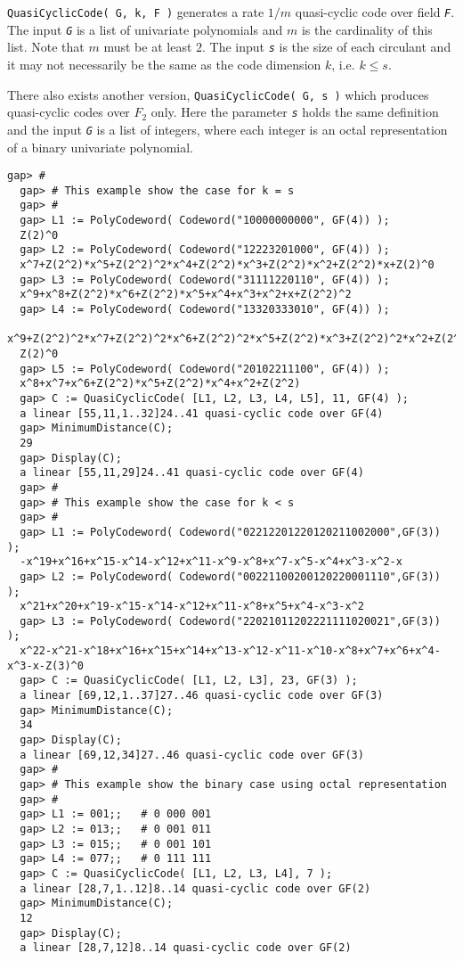 \documentclass[a4paper,11pt]{report}
\begin{document}
{{{ \texttt{QuasiCyclicCode( G, k, F )} generates a rate $1/m$ quasi-cyclic code over field \mbox{\texttt{\slshape F}}. The input \mbox{\texttt{\slshape G}} is a list of univariate polynomials and $m$ is the cardinality of this list. Note that $m$ must be at least $2$. The input \mbox{\texttt{\slshape s}} is the size of each circulant and it may not necessarily be the same as the
code dimension $k$, i.e. $k \le s$. 

 There also exists another version, \texttt{QuasiCyclicCode( G, s )} which produces quasi-cyclic codes over $F_2$ only. Here the parameter \mbox{\texttt{\slshape s}} holds the same definition and the input \mbox{\texttt{\slshape G}} is a list of integers, where each integer is an octal representation of a
binary univariate polynomial. }

 
\begin{Verbatim}[fontsize=\small,frame=single,label=Example]
  gap> #
  gap> # This example show the case for k = s
  gap> #
  gap> L1 := PolyCodeword( Codeword("10000000000", GF(4)) );
  Z(2)^0
  gap> L2 := PolyCodeword( Codeword("12223201000", GF(4)) );
  x^7+Z(2^2)*x^5+Z(2^2)^2*x^4+Z(2^2)*x^3+Z(2^2)*x^2+Z(2^2)*x+Z(2)^0
  gap> L3 := PolyCodeword( Codeword("31111220110", GF(4)) );
  x^9+x^8+Z(2^2)*x^6+Z(2^2)*x^5+x^4+x^3+x^2+x+Z(2^2)^2
  gap> L4 := PolyCodeword( Codeword("13320333010", GF(4)) );
  x^9+Z(2^2)^2*x^7+Z(2^2)^2*x^6+Z(2^2)^2*x^5+Z(2^2)*x^3+Z(2^2)^2*x^2+Z(2^2)^2*x+\
  Z(2)^0
  gap> L5 := PolyCodeword( Codeword("20102211100", GF(4)) );
  x^8+x^7+x^6+Z(2^2)*x^5+Z(2^2)*x^4+x^2+Z(2^2)
  gap> C := QuasiCyclicCode( [L1, L2, L3, L4, L5], 11, GF(4) );
  a linear [55,11,1..32]24..41 quasi-cyclic code over GF(4)
  gap> MinimumDistance(C);
  29
  gap> Display(C);
  a linear [55,11,29]24..41 quasi-cyclic code over GF(4)
  gap> #
  gap> # This example show the case for k < s
  gap> #
  gap> L1 := PolyCodeword( Codeword("02212201220120211002000",GF(3)) );
  -x^19+x^16+x^15-x^14-x^12+x^11-x^9-x^8+x^7-x^5-x^4+x^3-x^2-x
  gap> L2 := PolyCodeword( Codeword("00221100200120220001110",GF(3)) );
  x^21+x^20+x^19-x^15-x^14-x^12+x^11-x^8+x^5+x^4-x^3-x^2
  gap> L3 := PolyCodeword( Codeword("22021011202221111020021",GF(3)) );
  x^22-x^21-x^18+x^16+x^15+x^14+x^13-x^12-x^11-x^10-x^8+x^7+x^6+x^4-x^3-x-Z(3)^0
  gap> C := QuasiCyclicCode( [L1, L2, L3], 23, GF(3) );
  a linear [69,12,1..37]27..46 quasi-cyclic code over GF(3)
  gap> MinimumDistance(C);
  34
  gap> Display(C);
  a linear [69,12,34]27..46 quasi-cyclic code over GF(3)
  gap> #
  gap> # This example show the binary case using octal representation
  gap> #
  gap> L1 := 001;;   # 0 000 001
  gap> L2 := 013;;   # 0 001 011
  gap> L3 := 015;;   # 0 001 101
  gap> L4 := 077;;   # 0 111 111
  gap> C := QuasiCyclicCode( [L1, L2, L3, L4], 7 );
  a linear [28,7,1..12]8..14 quasi-cyclic code over GF(2)
  gap> MinimumDistance(C);
  12
  gap> Display(C);
  a linear [28,7,12]8..14 quasi-cyclic code over GF(2)
\end{Verbatim}
  

}}
\end{document}
